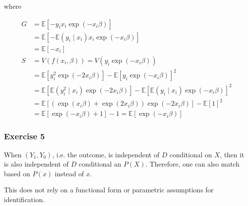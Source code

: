 {{\begin{enumerate}[label=(\alph*)]
{where

$$
\begin{aligned}
G &= \mathbb{E}\left[-y_{i} x_{i} \exp \left(-x_{i} \beta\right)\right] \\
& =\mathbb{E}\left[-\mathbb{E}\left(y_{i} \mid x_{i}\right) x_{i} \exp \left(-x_{i} \beta\right)\right] \\
& =\mathbb{E}\left[-x_{i}\right] \\
S & =V\left(f\left(x_{i}, \beta\right)\right)=V\left(y_{i} \exp \left(-x_{i} \beta\right)\right) \\
& =\mathbb{E}\left[y_{i}^{2} \exp \left(-2 x_{i} \beta\right)\right]-\mathbb{E}\left[y_{i} \exp \left(-x_{i} \beta\right)\right]^{2} \\
& =\mathbb{E}\left[\mathbb{E}\left(y_{i}^{2} \mid x_{i}\right) \exp \left(-2 x_{i} \beta\right)\right]-\mathbb{E}\left[\mathbb{E}\left(y_{i} \mid x_{i}\right) \exp \left(-x_{i} \beta\right)\right]^{2} \\
& =\mathbb{E}\left[\left(\exp \left(x_{i} \beta\right)+\exp \left(2 x_{i} \beta\right)\right) \exp \left(-2 x_{i} \beta\right)\right]-\mathbb{E}[1]^{2} \\
& =\mathbb{E}\left[\exp \left(-x_{i} \beta\right)+1\right]-1=\mathbb{E}\left[\exp \left(-x_{i} \beta\right)\right]
\end{aligned}
$$
}
\end{enumerate}
}
{
\subsubsection*{Exercise 5}
When $\left(Y_{1}, Y_{0}\right)$, i.e. the outcome, is independent of $D$ conditional on $X$, then it is also independent of $D$ conditional an $P(X)$. Therefore, one can also match based on $P(x)$ instead of $x$.

This does not rely on a functional form or parametric assumptions for identification.
}
}
